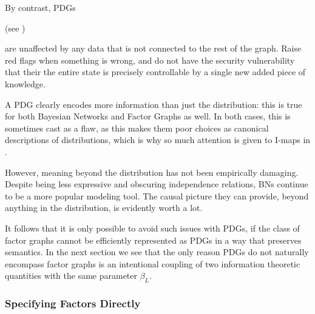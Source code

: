 \documentclass{article}
\theoremstyle{plain}
\theoremstyle{definition}
\theoremstyle{remark}
\numberwithin{equation}{section}
\begin{document}
{	By contrast, PDGs
	\begin{vfull}
	(see )
	\end{vfull}
	are unaffected by any data that is not connected to the rest of the graph. Raise red flags when something is wrong, and do not have the security vulnerability that their the entire state is precisely controllable by a single new added piece of knowledge.
	\begin{vfull}
		A PDG clearly encodes more information than just the
                distribution: this is true for both Bayesian Networks
                and Factor Graphs as well. In both cases, this is
                sometimes cast as a flaw, as this makes them poor
                choices as canonical descriptions of distributions,
                which is why so much attention is given to I-maps in
                \cite{koller2009probabilistic}.  
		
		However, meaning beyond the distribution has not been empirically damaging. Despite being less expressive and obscuring independence relations, BNs continue to be a more popular modeling tool. The causal picture they can provide, beyond anything in the distribution, is evidently worth a lot.
	\end{vfull}
	It follows that it is only possible to avoid such issues with PDGs, if the class of factor graphs cannot be efficiently represented as PDGs in a way that preserves semantics.
	In the next section we see that the only reason PDGs do not naturally encompass factor graphs is an intentional coupling of two information theoretic quantities with the same parameter $\beta_L$. 

	\subsubsection{Specifying Factors Directly}
%


}
\end{document}
